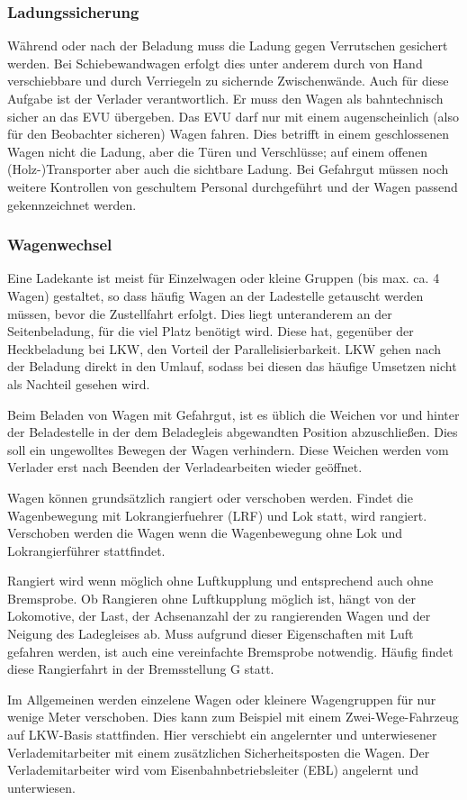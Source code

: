 \subsubsection{Ladungssicherung}
Während oder nach der Beladung muss die Ladung gegen Verrutschen gesichert werden. Bei Schiebewandwagen erfolgt dies unter anderem durch von Hand verschiebbare und durch Verriegeln zu sichernde Zwischenwände. Auch für diese Aufgabe ist der Verlader verantwortlich. Er muss den Wagen als bahntechnisch sicher an das EVU übergeben. Das EVU darf nur mit einem augenscheinlich (also für den Beobachter sicheren) Wagen fahren. Dies betrifft in einem geschlossenen Wagen nicht die Ladung, aber die Türen und Verschlüsse; auf einem offenen (Holz-)Transporter aber auch die sichtbare Ladung. Bei Gefahrgut müssen noch weitere Kontrollen von geschultem Personal durchgeführt und der Wagen passend gekennzeichnet werden.
\subsubsection{Wagenwechsel}\label{sec:Wagenwechsel}
Eine Ladekante ist meist für Einzelwagen oder kleine Gruppen (bis max. ca. 4 Wagen) gestaltet, so dass häufig Wagen an der Ladestelle getauscht werden müssen, bevor die Zustellfahrt erfolgt. Dies liegt unteranderem an der Seitenbeladung, für die viel Platz benötigt wird. Diese hat, gegenüber der Heckbeladung bei LKW, den Vorteil der Parallelisierbarkeit. LKW gehen nach der Beladung direkt in den Umlauf, sodass bei diesen das häufige Umsetzen nicht als Nachteil gesehen wird. \par
Beim Beladen von Wagen mit Gefahrgut, ist es üblich die Weichen vor und hinter der Beladestelle in der dem Beladegleis abgewandten Position abzuschließen. Dies soll ein ungewolltes Bewegen der Wagen verhindern. Diese Weichen werden vom Verlader erst nach Beenden der Verladearbeiten wieder geöffnet.\par
Wagen können grundsätzlich rangiert oder verschoben werden. Findet die Wagenbewegung mit \gls{Lokrangierfuehrer} (\acrshort{LRF}) und Lok statt, wird rangiert. Verschoben werden die Wagen wenn die Wagenbewegung ohne Lok und Lokrangierführer stattfindet.\par
Rangiert wird wenn möglich ohne Luftkupplung und entsprechend auch ohne \gls{Bremsprobe}. Ob Rangieren ohne Luftkupplung möglich ist, hängt von der Lokomotive, der Last, der Achsenanzahl der zu rangierenden Wagen und der Neigung des Ladegleises ab. Muss aufgrund dieser Eigenschaften mit Luft gefahren werden, ist auch eine vereinfachte \gls{Bremsprobe} notwendig. Häufig findet diese Rangierfahrt in der Bremsstellung G statt.\par
Im Allgemeinen werden einzelene Wagen oder kleinere Wagengruppen für nur wenige Meter verschoben. Dies kann zum Beispiel mit einem Zwei-Wege-Fahrzeug auf LKW-Basis stattfinden. Hier verschiebt ein angelernter und unterwiesener Verlademitarbeiter mit einem zusätzlichen Sicherheitsposten die Wagen. Der Verlademitarbeiter wird vom \gls{Eisenbahnbetriebsleiter} (\acrshort{EBL}) angelernt und unterwiesen.
